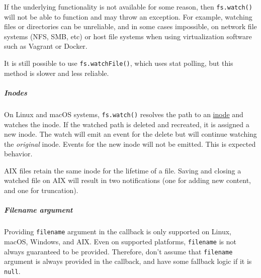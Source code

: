 If the underlying functionality is not available for some reason, then
\texttt{fs.watch()} will not be able to function and may throw an
exception. For example, watching files or directories can be unreliable,
and in some cases impossible, on network file systems (NFS, SMB, etc) or
host file systems when using virtualization software such as Vagrant or
Docker.

It is still possible to use \texttt{fs.watchFile()}, which uses stat
polling, but this method is slower and less reliable.

\subparagraph{Inodes}\label{inodes}

On Linux and macOS systems, \texttt{fs.watch()} resolves the path to an
\href{https://en.wikipedia.org/wiki/Inode}{inode} and watches the inode.
If the watched path is deleted and recreated, it is assigned a new
inode. The watch will emit an event for the delete but will continue
watching the \emph{original} inode. Events for the new inode will not be
emitted. This is expected behavior.

AIX files retain the same inode for the lifetime of a file. Saving and
closing a watched file on AIX will result in two notifications (one for
adding new content, and one for truncation).

\subparagraph{Filename argument}\label{filename-argument}

Providing \texttt{filename} argument in the callback is only supported
on Linux, macOS, Windows, and AIX. Even on supported platforms,
\texttt{filename} is not always guaranteed to be provided. Therefore,
don't assume that \texttt{filename} argument is always provided in the
callback, and have some fallback logic if it is \texttt{null}.

\begin{Shaded}
\begin{Highlighting}[]
 \OperatorTok{;}
\NormalTok{(}\OperatorTok{,}\OperatorTok{,}\KeywordTok{=\textgreater{}}\NormalTok{ \{}
  \NormalTok{(}\SpecialCharTok{$\{}\SpecialCharTok{\}}\VerbatimStringTok{\textasciigrave{}}\NormalTok{)}\OperatorTok{;}
    \NormalTok{(}\SpecialCharTok{$\{}\SpecialCharTok{\}}\VerbatimStringTok{\textasciigrave{}}\NormalTok{)}\OperatorTok{;}
\NormalTok{  \} }\NormalTok{ \{}
    \NormalTok{(}\NormalTok{)}\OperatorTok{;}
\NormalTok{  \}}
\NormalTok{\})}\OperatorTok{;}
\end{Highlighting}
\end{Shaded}

